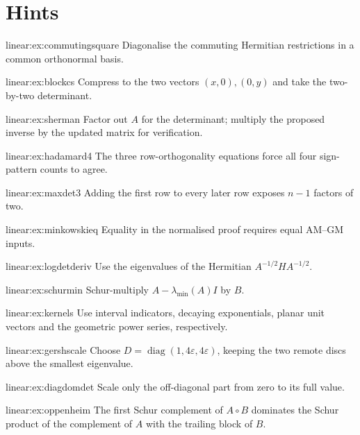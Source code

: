 \section{Hints}
\begin{hint}{linear:ex:commutingsquare}
Diagonalise the commuting Hermitian restrictions in a common orthonormal basis.
\end{hint}
\begin{hint}{linear:ex:blockcs}
Compress to the two vectors $(x,0),(0,y)$ and take the two-by-two determinant.
\end{hint}
\begin{hint}{linear:ex:sherman}
Factor out $A$ for the determinant; multiply the proposed inverse by the updated matrix for verification.
\end{hint}
\begin{hint}{linear:ex:hadamard4}
The three row-orthogonality equations force all four sign-pattern counts to agree.
\end{hint}
\begin{hint}{linear:ex:maxdet3}
Adding the first row to every later row exposes $n-1$ factors of two.
\end{hint}
\begin{hint}{linear:ex:minkowskieq}
Equality in the normalised proof requires equal AM--GM inputs.
\end{hint}
\begin{hint}{linear:ex:logdetderiv}
Use the eigenvalues of the Hermitian $A^{-1/2}HA^{-1/2}$.
\end{hint}
\begin{hint}{linear:ex:schurmin}
Schur-multiply $A-\lambda_{\min}(A)I$ by $B$.
\end{hint}
\begin{hint}{linear:ex:kernels}
Use interval indicators, decaying exponentials, planar unit vectors and the geometric power series, respectively.
\end{hint}
\begin{hint}{linear:ex:gershscale}
Choose $D=\operatorname{diag}(1,4\varepsilon,4\varepsilon)$, keeping the two remote discs above the smallest eigenvalue.
\end{hint}
\begin{hint}{linear:ex:diagdomdet}
Scale only the off-diagonal part from zero to its full value.
\end{hint}
\begin{hint}{linear:ex:oppenheim}
The first Schur complement of $A\circ B$ dominates the Schur product of the complement of $A$ with the trailing block of $B$.
\end{hint}
